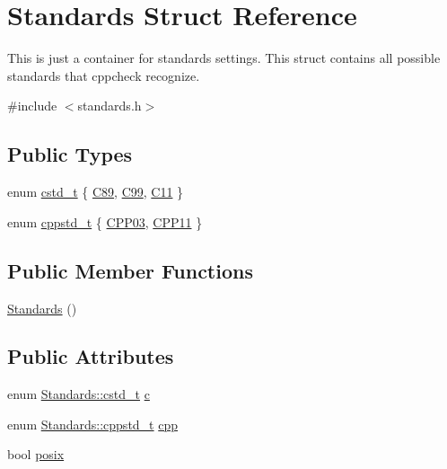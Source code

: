 \hypertarget{struct_standards}{\section{Standards Struct Reference}
\label{struct_standards}
}


This is just a container for standards settings. This struct contains all possible standards that cppcheck recognize.  




{\ttfamily \#include $<$standards.\-h$>$}

\subsection*{Public Types}
\begin{DoxyCompactItemize}
\item 
enum \hyperlink{struct_standards_a378c5771344ba6de432a502a4573b59a}{cstd\-\_\-t} \{ \hyperlink{struct_standards_a378c5771344ba6de432a502a4573b59aaa1646450d9c145c9f83fa6a1f496fa2f}{C89}, 
\hyperlink{struct_standards_a378c5771344ba6de432a502a4573b59aa50e6d93ae010b10e5ff09f189a6ae510}{C99}, 
\hyperlink{struct_standards_a378c5771344ba6de432a502a4573b59aad6e76e108173a940ec1422056d104c43}{C11}
 \}
\item 
enum \hyperlink{struct_standards_ad2ffa779504d6f6b30e185d6853991c7}{cppstd\-\_\-t} \{ \hyperlink{struct_standards_ad2ffa779504d6f6b30e185d6853991c7abf9a0c26dc4eb9594642765f6358bbd5}{C\-P\-P03}, 
\hyperlink{struct_standards_ad2ffa779504d6f6b30e185d6853991c7ae2869e6757f9e93393948063f4fa059f}{C\-P\-P11}
 \}
\end{DoxyCompactItemize}
\subsection*{Public Member Functions}
\begin{DoxyCompactItemize}
\item 
\hyperlink{struct_standards_a9434fb92899373f28b93e572a1a3c6db}{Standards} ()
\end{DoxyCompactItemize}
\subsection*{Public Attributes}
\begin{DoxyCompactItemize}
\item 
enum \hyperlink{struct_standards_a378c5771344ba6de432a502a4573b59a}{Standards\-::cstd\-\_\-t} \hyperlink{struct_standards_a89e7be6761f6fe1e897bac4e7fed4f89}{c}
\item 
enum \hyperlink{struct_standards_ad2ffa779504d6f6b30e185d6853991c7}{Standards\-::cppstd\-\_\-t} \hyperlink{struct_standards_a09b39d1359bd629a599aa5ed9de93dcb}{cpp}
\item 
bool \hyperlink{struct_standards_ae98f2da6953f4ce65a761e1d15d76233}{posix}
\end{DoxyCompactItemize}


